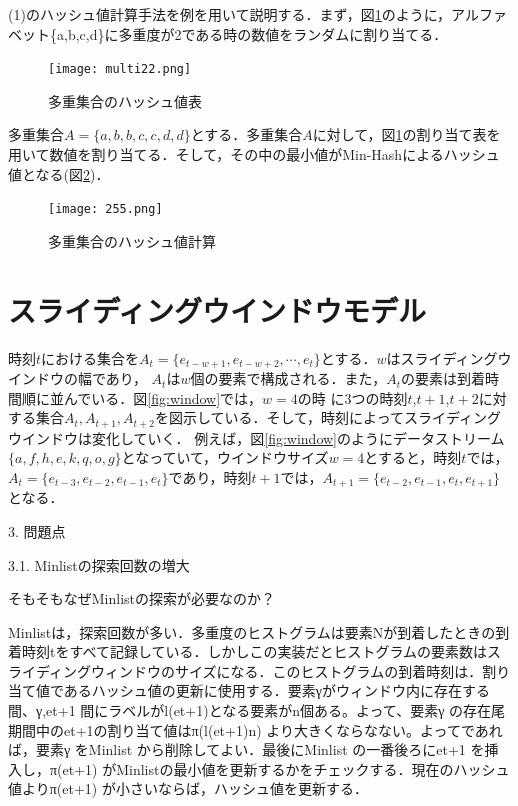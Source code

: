 (1)のハッシュ値計算手法を例を用いて説明する．まず，図\ref{fig:2wariate}のように，アルファベット\{a,b,c,d\}に多重度が2である時の数値をランダムに割り当てる．
\begin{figure}[H]
  \centering
  \texttt{[image: multi22.png]}
  \caption{多重集合のハッシュ値表}
  \label{fig:2wariate}
\end{figure}

多重集合$A =\{a,b,b,c,c,d,d\}$とする．多重集合$A$に対して，図\ref{fig:2wariate}の割り当て表を用いて数値を割り当てる．そして，その中の最小値がMin-Hashによるハッシュ値となる(図\ref{fig:255})．

\begin{figure}[H]
  \centering
  \texttt{[image: 255.png]}
  \caption{多重集合のハッシュ値計算}
  \label{fig:255}
\end{figure}

\section{スライディングウインドウモデル}
時刻$t$における集合を$A_t=\{e_{t-w+1},e_{t-w+2},\cdots,e_t\}$とする．$w$はスライディングウインドウの幅であり，
$A_t$は$w$個の要素で構成される．また，$A_t$の要素は到着時間順に並んでいる．図\ref{fig:window}では，$w=4$の時
に3つの時刻$t$,$t+1$,$t+2$に対する集合$A_t,A_{t+1},A_{t+2}$を図示している．そして，時刻によってスライディングウインドウは変化していく．
例えば，図\ref{fig:window}のようにデータストリーム$\{a,f,h,e,k,q,o,g\}$となっていて，ウインドウサイズ$w=4$とすると，時刻$t$では，
$A_{t}=\{e_{t-3},e_{t-2},e_{t-1},e_t\}$であり，時刻$t +1$では，$A_{t+1}=\{e_{t-2},e_{t-1},e_t,e_{t+1}\}$となる．

3. 問題点

3.1. Minlistの探索回数の増大

そもそもなぜMinlistの探索が必要なのか？

Minlistは，探索回数が多い．多重度のヒストグラムは要素Nが到着したときの到着時刻tをすべて記録している．しかしこの実装だとヒストグラムの要素数はスライディングウィンドウのサイズになる．このヒストグラムの到着時刻は．割り当て値であるハッシュ値の更新に使用する．要素γがウィンドウ内に存在する間、γ,et+1 間にラベルがl(et+1)となる要素がn個ある。よって、要素γ の存在尾期間中のet+1の割り当て値はπ(l(et+1)n) より大きくならなない。よってであれば，要素γ をMinlist から削除してよい．最後にMinlist の一番後ろにet+1 を挿入し，π(et+1) がMinlistの最小値を更新するかをチェックする．現在のハッシュ値よりπ(et+1) が小さいならば，ハッシュ値を更新する．

